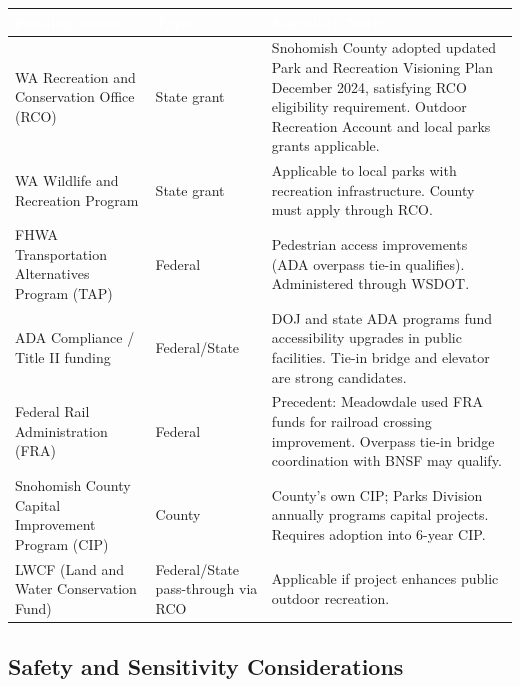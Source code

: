 \documentclass[11pt,letterpaper]{article}
\newcommand{\tableheader}[1]{\textbf{\sffamily\textcolor{white}{#1}}}
\begin{document}
\begin{center}
\begin{tabularx}{\textwidth}{L{4cm}L{2cm}X}
\toprule
{}
\tableheader{Funding Source} & \tableheader{Type} & \tableheader{Eligibility Notes} \\
\midrule
WA Recreation and Conservation Office (RCO) & State grant & Snohomish County adopted updated Park and Recreation Visioning Plan December 2024, satisfying RCO eligibility requirement. Outdoor Recreation Account and local parks grants applicable. \\
WA Wildlife and Recreation Program & State grant & Applicable to local parks with recreation infrastructure. County must apply through RCO. \\
FHWA Transportation Alternatives Program (TAP) & Federal & Pedestrian access improvements (ADA overpass tie-in qualifies). Administered through WSDOT. \\
ADA Compliance / Title II funding & Federal/State & DOJ and state ADA programs fund accessibility upgrades in public facilities. Tie-in bridge and elevator are strong candidates. \\
Federal Rail Administration (FRA) & Federal & Precedent: Meadowdale used FRA funds for railroad crossing improvement. Overpass tie-in bridge coordination with BNSF may qualify. \\
Snohomish County Capital Improvement Program (CIP) & County & County's own CIP; Parks Division annually programs capital projects. Requires adoption into 6-year CIP. \\
LWCF (Land and Water Conservation Fund) & Federal/State pass-through via RCO & Applicable if project enhances public outdoor recreation. \\
\bottomrule
\end{tabularx}
\end{center}

\subsection{Safety and Sensitivity Considerations}
\end{document}
